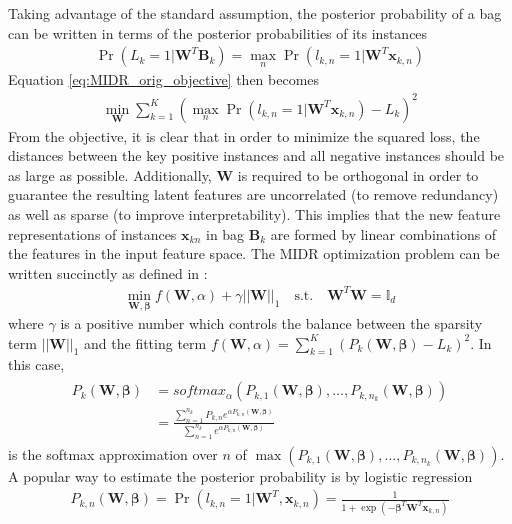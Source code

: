 \noindent
Taking advantage of the standard assumption, the posterior probability of a bag can be written in terms of the posterior probabilities of its instances
\begin{align}
	\Pr(L_{k}=1|\bm{W}^{T}\bm{B}_{k}) = \max_{n} \Pr(l_{k,n}=1|\bm{W}^{T}\bm{x}_{k,n}) 
\end{align}
Equation \ref{eq:MIDR_orig_objective} then becomes 
\begin{align}
	\min_{\bm{W}} \sum_{k=1}^{K} (\max_{n} \Pr(l_{k,n}=1|\bm{W}^{T}\bm{x}_{k,n}) - L_{k})^{2}
	\label{eq:MIDR_instance_objective}
\end{align}
\noindent
From the objective, it is clear that in order to minimize the squared loss, the distances between the key positive instances and all negative instances should be as large as possible. Additionally, $\bm{W}$ is required to be orthogonal in order to guarantee the resulting latent features are uncorrelated (to remove redundancy) as well as sparse (to improve interpretability).  This implies that the new feature representations of instances $\bm{x}_{kn}$ in bag $\bm{B}_{k}$ are formed by linear combinations of the features in the input feature space.  The MIDR optimization problem can be written succinctly as defined in \citep{Zhu2018MIDRSparsity}:
\begin{align}
	\min_{\bm{W},\bm{\beta}} f(\bm{W},\alpha) + \gamma ||\bm{W} ||_{1}  \quad \text{s.t.} \quad \bm{W}^{T}\bm{W} = \mathbb{I}_{d}
\end{align}
\noindent
where $\gamma$ is a positive number which controls the balance between the sparsity term $||\bm{W}||_{1}$ and the fitting term $f(\bm{W},\alpha)=\sum_{k=1}^{K} (P_{k}(\bm{W},\bm{\beta}) - L_{k})^{2}$.  In this case, 
\begin{align}
	\begin{split}
	P_{k}(\bm{W},\bm{\beta}) &= softmax_{\alpha}(P_{k,1}(\bm{\bm{W}},\bm{\beta}), \dots, P_{k,n_{k}}(\bm{\bm{W}},\bm{\beta})) \\
	&= \frac{\sum_{n=1}^{n_{k}}P_{k,n}e^{\alpha P_{k,n}(\bm{W},\bm{\beta})}}{\sum_{n=1}^{n_{k}}e^{\alpha P_{k,n}(\bm{W},\bm{\beta})}}
	\end{split}
\end{align}
\noindent
is the softmax approximation over $n$ of $\max (P_{k,1}(\bm{\bm{W}},\bm{\beta}), \dots, P_{k,n_{k}}(\bm{\bm{W}},\bm{\beta}))$.  A popular way to estimate the posterior probability is by logistic regression
\begin{align}
	P_{k,n}(\bm{W},\bm{\beta}) = \Pr(l_{k,n}=1|\bm{W}^{T},\bm{x}_{k,n}) = \frac{1}{1+\exp(-\bm{\beta}^{T} \bm{W}^{T}\bm{x}_{k,n})}
\end{align}
